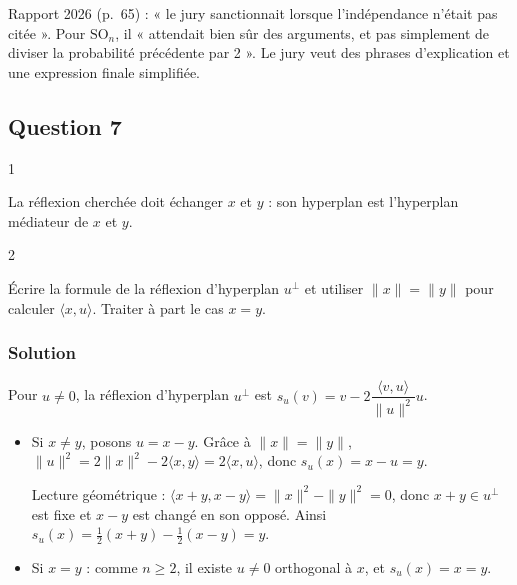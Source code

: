 \documentclass[11pt,a4paper]{article}
\begin{document}
\begin{jury}

Rapport 2026 (p.~65) : « le jury sanctionnait lorsque l'indépendance n'était pas citée ». Pour \({\mathrm{SO}}_n\), il « attendait bien sûr des arguments, et pas simplement de diviser la probabilité précédente par 2 ». Le jury veut des phrases d'explication et une expression finale simplifiée.

\end{jury}

\hypertarget{question-7}{%
\subsection{Question 7}\label{question-7}}

\begin{indication}{1}

La réflexion cherchée doit échanger \(x\) et \(y\) : son hyperplan est l'hyperplan médiateur de \(x\) et \(y\).

\end{indication}

\begin{indication}{2}

Écrire la formule de la réflexion d'hyperplan \(u^\perp\) et utiliser \(\|x\|=\|y\|\) pour calculer \(\langle x,u\rangle\). Traiter à part le cas \(x=y\).

\end{indication}

\hypertarget{solution-6}{%
\subsubsection{Solution}\label{solution-6}}

Pour \(u\neq0\), la réflexion d'hyperplan \(u^\perp\) est \(s_u(v)=v-2\dfrac{\langle v,u\rangle}{\|u\|^2}u\).

\begin{itemize}
\item
  Si \(x\neq y\), posons \(u=x-y\). Grâce à \(\|x\|=\|y\|\), \(\|u\|^2=2\|x\|^2-2\langle x,y\rangle=2\langle x,u\rangle\), donc \(s_u(x)=x-u=y\).

  Lecture géométrique : \(\langle x+y,x-y\rangle=\|x\|^2-\|y\|^2=0\), donc \(x+y\in u^\perp\) est fixe et \(x-y\) est changé en son opposé. Ainsi \(s_u(x)=\frac12(x+y)-\frac12(x-y)=y\).
\item
  Si \(x=y\) : comme \(n\ge2\), il existe \(u\neq0\) orthogonal à \(x\), et \(s_u(x)=x=y\).
\end{itemize}
\end{document}
